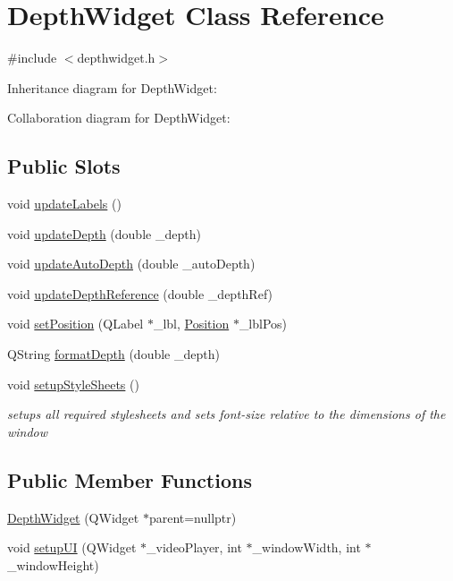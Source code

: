 \hypertarget{class_depth_widget}{}\section{Depth\+Widget Class Reference}
\label{class_depth_widget}


{\ttfamily \#include $<$depthwidget.\+h$>$}



Inheritance diagram for Depth\+Widget\+:


Collaboration diagram for Depth\+Widget\+:
\subsection*{Public Slots}
\begin{DoxyCompactItemize}
\item 
void \mbox{\hyperlink{class_depth_widget_a96a2f50285066aa3749b134e5bfa8813}{update\+Labels}} ()
\item 
void \mbox{\hyperlink{class_depth_widget_a44be5fa720f51307cd5b1d67ce6c2939}{update\+Depth}} (double \+\_\+depth)
\item 
void \mbox{\hyperlink{class_depth_widget_a860f4a3fcbfea2c39fa747b1ee810a17}{update\+Auto\+Depth}} (double \+\_\+auto\+Depth)
\item 
void \mbox{\hyperlink{class_depth_widget_a26a28ba4a8de2fce6d7a1e46e87b493e}{update\+Depth\+Reference}} (double \+\_\+depth\+Ref)
\item 
void \mbox{\hyperlink{class_depth_widget_af211eeb4ae068a45a5ed08f445cadf10}{set\+Position}} (Q\+Label $\ast$\+\_\+lbl, \mbox{\hyperlink{class_position}{Position}} $\ast$\+\_\+lbl\+Pos)
\item 
Q\+String \mbox{\hyperlink{class_depth_widget_a4823070667928cecf48f4c071cb76d1b}{format\+Depth}} (double \+\_\+depth)
\item 
void \mbox{\hyperlink{class_depth_widget_ae0988973b723b0d5e89424353c64f916}{setup\+Style\+Sheets}} ()
\begin{DoxyCompactList}\small\item\em setups all required stylesheets and sets font-\/size relative to the dimensions of the window \end{DoxyCompactList}\end{DoxyCompactItemize}
\subsection*{Public Member Functions}
\begin{DoxyCompactItemize}
\item 
\mbox{\hyperlink{class_depth_widget_a81de88bda23d375b258114868e076e81}{Depth\+Widget}} (Q\+Widget $\ast$parent=nullptr)
\item 
void \mbox{\hyperlink{class_depth_widget_ae03d5522882f541f0779adc95830d60c}{setup\+UI}} (Q\+Widget $\ast$\+\_\+video\+Player, int $\ast$\+\_\+window\+Width, int $\ast$\+\_\+window\+Height)
\end{DoxyCompactItemize}
